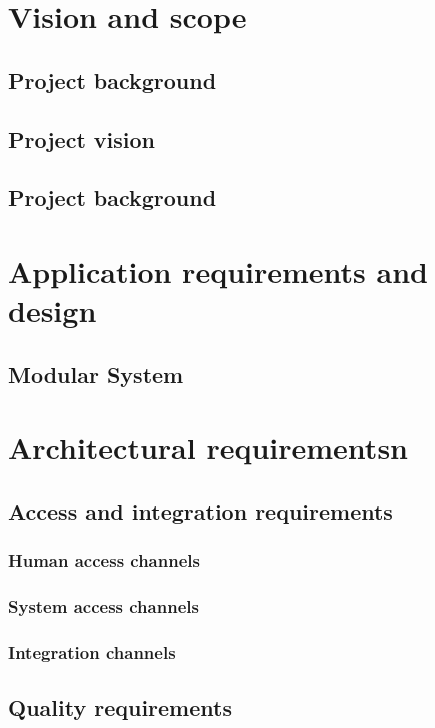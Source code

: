 \documentclass[a4paper,12pt,titlepage]{article}
\begin{document}


\tableofcontents
\newpage




\section{Vision and scope}
	\subsection{Project background}
	\subsection{Project vision}
	\subsection{Project background}

\section{Application requirements and design}
	\subsection{Modular System}

\section{Architectural requirementsn}
	\subsection{Access and integration requirements}
			\subsubsection{Human access channels}	
			\subsubsection{System access channels}	
			\subsubsection{Integration channels}
	\subsection{Quality requirements}
\end{document}
